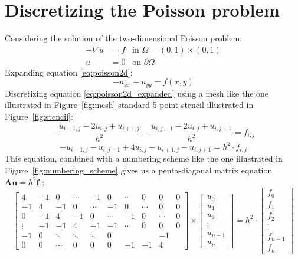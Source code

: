
\section{Discretizing the Poisson problem} %
\label{sec:discretizing_the_poisson_problem}
Considering the solution of the two-dimensional Poisson problem:
\begin{align}
  - \nabla u &= f \;\;\; \text{in } \Omega = (0,1) \times (0,1) \label{eq:poisson2d} \\
  u &= 0 \;\;\; \text{on } \partial \Omega \label{eq:poisson2d_edge}
\end{align}
Expanding equation \eqref{eq:poisson2d}:
\begin{equation}
  -u_{xx} - u_{yy} = f(x,y) \label{eq:poisson2d_expanded}
\end{equation}
Discretizing equation \eqref{eq:poisson2d_expanded} using a mesh like the one illustrated in Figure~\ref{fig:mesh} standard 5-point stencil illustrated in Figure~\ref{fig:stencil}:
\begin{equation}
  \nonumber
  - \frac{u_{i-1,j} - 2u_{i,j} + u_{i+1,j}}{h^2} - \frac{u_{i,j-1} - 2u_{i,j} + u_{i,j+1}}{h^2} = f_{i,j}
\end{equation}
\begin{equation}
  -u_{i-1,j} -u_{i,j-1} + 4u_{i,j} - u_{i+1,j} - u_{i,j+1} = h^2 \cdot f_{i,j}
\end{equation}
This equation, combined with a numbering scheme like the one illustrated in Figure~\ref{fig:numbering_scheme} gives us a penta-diagonal matrix equation $\mathbf{Au}=h^2\mathbf{f}$ :
\begin{equation}
  \begin{bmatrix}
    4      & -1 & 0      & \cdots & -1     & 0      & \cdots & 0      & 0      & 0 \\
    -1     & 4  & -1     & 0      & \cdots & -1     & 0      & \cdots & 0      & 0 \\
    0      & -1 & 4      & -1     & 0      & \cdots & -1     & 0      & \cdots & 0 \\
    \vdots & -1 & -1     & 4      & -1     & -1     & \cdots & 0      & 0      & 0 \\
    -1     & 0  & \ddots & \ddots & \ddots & 0      &        &        & -1     &   \\
    0      & 0  & \cdots &  0     & 0      &  0     &  -1    & -1     & 4      &
  \end{bmatrix}
  \times
  \begin{bmatrix}
    u_0 \\ u_1 \\ u_2 \\ \vdots \\ u_{n-1} \\ u_n
  \end{bmatrix}
  =
  h^2 \cdot
  \begin{bmatrix}
    f_0 \\ f_1 \\ f_2 \\ \vdots \\ f_{n-1} \\ f_n
  \end{bmatrix}
\end{equation}
